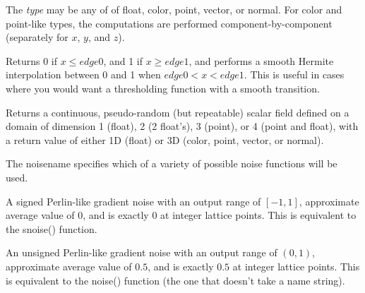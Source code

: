 \documentclass[11pt,letterpaper]{book}
\def\color{{\cf color}\xspace}
\def\float{{\cf float}\xspace}
\def\normal{{\cf normal}\xspace}
\def\point{{\cf point}\xspace}
\def\vector{{\cf vector}\xspace}
\begin{document}
The \emph{type} may be any of of \float, \color, \point, \vector, or
\normal.  For \color and \point-like types, the computations are
performed component-by-component (separately for $x$, $y$, and $z$).
\apiend

Returns 0 if $x \le {\mathit edge0}$, and 1 if $x \ge {\mathit edge1}$,
and performs a smooth Hermite
interpolation between 0 and 1 when ${\mathit edge0} < x < {\mathit edge1}$.
This is useful in cases where you would want a thresholding function
with a smooth transition.
\apiend

%


Returns a continuous, pseudo-random (but repeatable) scalar field
defined on a domain of dimension 1 (\float), 2 (2 \float's), 3 (\point),
or 4 (\point and \float), with a return value of either 1D (\float) or 3D
(\color, \point, \vector, or \normal).

The {\cf noisename} specifies which of a variety of possible noise
functions will be used.  

\vspace{12pt}

A signed Perlin-like gradient noise with an output range of $[-1,1]$,
approximate average value of $0$, and is exactly $0$ at integer lattice
points.  This is equivalent to the {\cf snoise()} function.

\apiend
\vspace{-16pt}

\vspace{12pt}
An unsigned Perlin-like gradient noise with an output range of $(0,1)$,
approximate average value of $0.5$, and is exactly $0.5$ at integer
lattice points.  This is equivalent to the {\cf noise()} function (the
one that doesn't take a name string).
\apiend
\vspace{-16pt}
\end{document}

